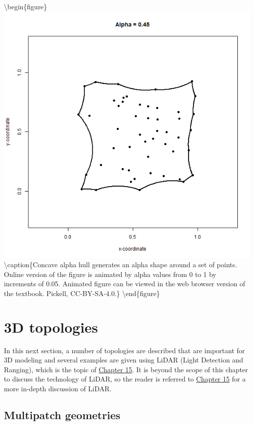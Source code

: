 \documentclass[
]{book}
\begin{document}
\textbackslash begin\{figure\}
\includegraphics[width=0.75\linewidth]{images/07-2d-alpha-hull} \textbackslash caption\{Concave alpha hull generates an alpha shape around a set of points. Online version of the figure is animated by alpha values from 0 to 1 by increments of 0.05. Animated figure can be viewed in the web browser version of the textbook. Pickell, CC-BY-SA-4.0.\}\label{fig:7-2d-alpha-hull}
\textbackslash end\{figure\}

\hypertarget{d-topologies}{%
\section{3D topologies}\label{d-topologies}}

In this next section, a number of topologies are described that are important for 3D modeling and several examples are given using LiDAR (Light Detection and Ranging), which is the topic of \href{https://ubc-geomatics-textbook.github.io/geomatics-textbook/LiDAR-acquisition-and-analysis.html}{Chapter 15}. It is beyond the scope of this chapter to discuss the technology of LiDAR, so the reader is referred to \href{https://ubc-geomatics-textbook.github.io/geomatics-textbook/LiDAR-acquisition-and-analysis.html}{Chapter 15} for a more in-depth discussion of LiDAR.

\hypertarget{multipatch-geometries-1}{%
\subsection{Multipatch geometries}\label{multipatch-geometries-1}}
\end{document}
